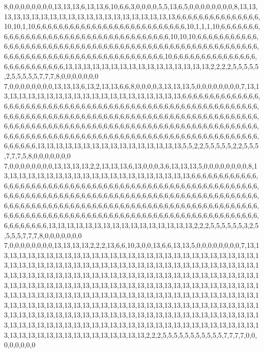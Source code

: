 8,0,0,0,0,0,0,0,0,13,13,13,6,13,13,6,10,6,6,3,0,0,0,0,5,5,13,6,5,0,0,0,0,0,0,0,0,8,13,13,13,13,13,13,13,13,13,13,13,13,13,13,13,13,13,13,13,13,13,6,6,6,6,6,6,6,6,6,6,6,6,6,6,6,10,10,1,10,6,6,6,6,6,6,6,6,6,6,6,6,6,6,6,6,6,6,6,6,6,6,6,6,6,6,6,10,1,1,1,10,6,6,6,6,6,6,6,6,6,6,6,6,6,6,6,6,6,6,6,6,6,6,6,6,6,6,6,6,6,6,6,6,6,6,6,6,6,10,10,10,6,6,6,6,6,6,6,6,6,6,6,6,6,6,6,6,6,6,6,6,6,6,6,6,6,6,6,6,6,6,6,6,6,6,6,6,6,6,6,6,6,6,6,6,6,6,6,6,6,6,6,6,6,6,6,6,6,6,6,6,6,6,6,6,6,6,6,6,6,6,6,6,6,6,6,6,6,6,6,6,6,6,6,6,6,6,10,6,6,6,6,6,6,6,6,6,6,6,6,6,6,6,6,6,6,6,6,6,6,6,6,6,6,13,13,13,13,13,13,13,13,13,13,13,13,13,13,13,13,2,2,2,2,5,5,5,5,5,2,5,5,5,5,5,7,7,7,8,0,0,0,0,0,0,0
7,0,0,0,0,0,0,0,0,13,13,13,6,13,2,13,13,6,6,8,0,0,0,0,3,13,13,13,5,0,0,0,0,0,0,0,0,7,13,13,13,13,13,13,13,13,13,13,13,13,13,13,13,13,13,13,13,13,13,6,6,6,6,6,6,6,6,6,6,6,6,6,6,6,6,6,6,6,6,6,6,6,6,6,6,6,6,6,6,6,6,6,6,6,6,6,6,6,6,6,6,6,6,6,6,6,6,6,6,6,6,6,6,6,6,6,6,6,6,6,6,6,6,6,6,6,6,6,6,6,6,6,6,6,6,6,6,6,6,6,6,6,6,6,6,6,6,6,6,6,6,6,6,6,6,6,6,6,6,6,6,6,6,6,6,6,6,6,6,6,6,6,6,6,6,6,6,6,6,6,6,6,6,6,6,6,6,6,6,6,6,6,6,6,6,6,6,6,6,6,6,6,6,6,6,6,6,6,6,6,6,6,6,6,6,6,6,6,6,6,6,6,6,6,6,6,6,6,6,6,6,6,6,6,6,6,6,6,6,6,6,6,6,6,6,6,6,6,6,6,6,6,6,6,6,6,6,6,6,6,6,6,6,13,13,13,13,13,13,13,13,13,13,13,13,13,13,13,13,5,5,2,2,5,5,5,5,5,2,2,5,5,5,7,7,7,5,8,0,0,0,0,0,0,0
7,0,0,0,0,0,0,0,0,13,13,13,13,2,2,13,13,13,6,13,0,0,0,3,6,13,13,13,5,0,0,0,0,0,0,0,0,8,13,13,13,13,13,13,13,13,13,13,13,13,13,13,13,13,13,13,13,13,13,6,6,6,6,6,6,6,6,6,6,6,6,6,6,6,6,6,6,6,6,6,6,6,6,6,6,6,6,6,6,6,6,6,6,6,6,6,6,6,6,6,6,6,6,6,6,6,6,6,6,6,6,6,6,6,6,6,6,6,6,6,6,6,6,6,6,6,6,6,6,6,6,6,6,6,6,6,6,6,6,6,6,6,6,6,6,6,6,6,6,6,6,6,6,6,6,6,6,6,6,6,6,6,6,6,6,6,6,6,6,6,6,6,6,6,6,6,6,6,6,6,6,6,6,6,6,6,6,6,6,6,6,6,6,6,6,6,6,6,6,6,6,6,6,6,6,6,6,6,6,6,6,6,6,6,6,6,6,6,6,6,6,6,6,6,6,6,6,6,6,6,6,6,6,6,6,6,6,6,6,6,6,6,6,6,6,6,6,6,6,6,6,6,6,6,6,6,6,6,6,6,6,6,6,13,13,13,13,13,13,13,13,13,13,13,13,13,13,13,13,2,2,2,5,5,5,5,5,5,3,2,5,5,5,5,7,7,7,8,0,0,0,0,0,0,0
7,0,0,0,0,0,0,0,0,13,13,13,13,2,2,2,13,6,6,10,3,0,0,13,6,6,13,13,5,0,0,0,0,0,0,0,0,7,13,13,13,13,13,13,13,13,13,13,13,13,13,13,13,13,13,13,13,13,13,13,13,13,13,13,13,13,13,13,13,13,13,13,13,13,13,13,13,13,13,13,13,13,13,13,13,13,13,13,13,13,13,13,13,13,13,13,13,13,13,13,13,13,13,13,13,13,13,13,13,13,13,13,13,13,13,13,13,13,13,13,13,13,13,13,13,13,13,13,13,13,13,13,13,13,13,13,13,13,13,13,13,13,13,13,13,13,13,13,13,13,13,13,13,13,13,13,13,13,13,13,13,13,13,13,13,13,13,13,13,13,13,13,13,13,13,13,13,13,13,13,13,13,13,13,13,13,13,13,13,13,13,13,13,13,13,13,13,13,13,13,13,13,13,13,13,13,13,13,13,13,13,13,13,13,13,13,13,13,13,13,13,13,13,13,13,13,13,13,13,13,13,13,13,13,13,13,13,13,13,13,13,13,13,13,13,13,13,13,13,13,13,13,13,13,13,13,13,13,13,13,13,13,13,13,13,13,13,13,13,13,13,13,13,13,13,13,13,13,13,2,2,2,5,5,5,5,5,5,5,5,5,5,5,7,7,7,7,0,0,0,0,0,0,0,0
